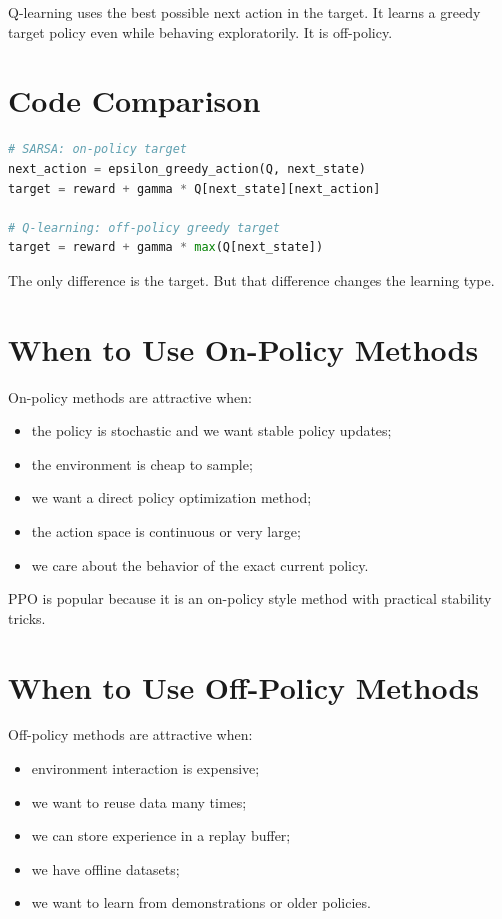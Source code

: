 \documentclass[11pt]{article}
\begin{document}
Q-learning uses the best possible next action in the target.
It learns a greedy target policy even while behaving exploratorily.
It is off-policy.

\section{Code Comparison}

\begin{lstlisting}[language=Python]
# SARSA: on-policy target
next_action = epsilon_greedy_action(Q, next_state)
target = reward + gamma * Q[next_state][next_action]

# Q-learning: off-policy greedy target
target = reward + gamma * max(Q[next_state])
\end{lstlisting}

The only difference is the target.
But that difference changes the learning type.

\section{When to Use On-Policy Methods}

On-policy methods are attractive when:

\begin{itemize}[leftmargin=2em]
    \item the policy is stochastic and we want stable policy updates;
    \item the environment is cheap to sample;
    \item we want a direct policy optimization method;
    \item the action space is continuous or very large;
    \item we care about the behavior of the exact current policy.
\end{itemize}

PPO is popular because it is an on-policy style method with practical stability tricks.

\section{When to Use Off-Policy Methods}

Off-policy methods are attractive when:

\begin{itemize}[leftmargin=2em]
    \item environment interaction is expensive;
    \item we want to reuse data many times;
    \item we can store experience in a replay buffer;
    \item we have offline datasets;
    \item we want to learn from demonstrations or older policies.
\end{itemize}
\end{document}
